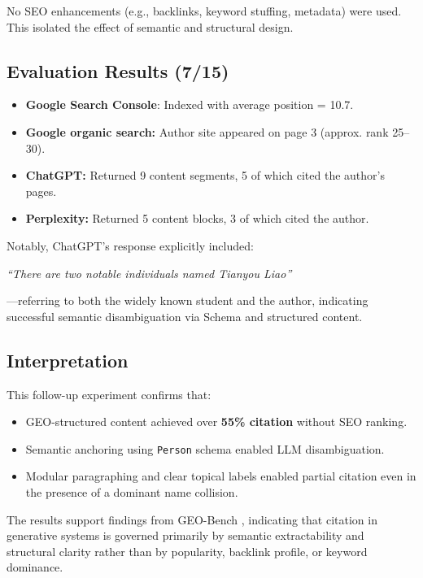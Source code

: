 No SEO enhancements (e.g., backlinks, keyword stuffing, metadata) were used. This isolated the effect of semantic and structural design.

\subsection{Evaluation Results (7/15)}

\begin{itemize}
  \item \textbf{Google Search Console}: Indexed with average position = 10.7.
  \item \textbf{Google organic search:} Author site appeared on page 3 (approx. rank 25--30).
  \item \textbf{ChatGPT:} Returned 9 content segments, 5 of which cited the author’s pages.
  \item \textbf{Perplexity:} Returned 5 content blocks, 3 of which cited the author.
\end{itemize}

Notably, ChatGPT’s response explicitly included:

\textit{“There are two notable individuals named Tianyou Liao”}

---referring to both the widely known student and the author, indicating successful semantic disambiguation via Schema and structured content.

\subsection{Interpretation}

This follow-up experiment confirms that:

\begin{itemize}
  \item GEO-structured content achieved over \textbf{55\% citation} without SEO ranking.
  \item Semantic anchoring using \texttt{Person} schema enabled LLM disambiguation.
  \item Modular paragraphing and clear topical labels enabled partial citation even in the presence of a dominant name collision.
\end{itemize}

The results support findings from GEO-Bench \cite{aggarwal2024geo}, indicating that citation in generative systems is governed primarily by semantic extractability and structural clarity rather than by popularity, backlink profile, or keyword dominance.
